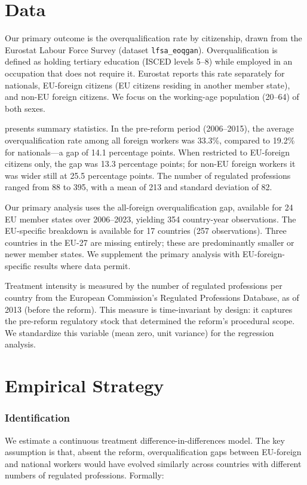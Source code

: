 \documentclass[12pt]{article}
\begin{document}
\section{Data}\label{sec:data}

Our primary outcome is the overqualification rate by citizenship, drawn from the Eurostat Labour Force Survey (dataset \texttt{lfsa\_eoqgan}). Overqualification is defined as holding tertiary education (ISCED levels 5--8) while employed in an occupation that does not require it. Eurostat reports this rate separately for nationals, EU-foreign citizens (EU citizens residing in another member state), and non-EU foreign citizens. We focus on the working-age population (20--64) of both sexes.



 presents summary statistics. In the pre-reform period (2006--2015), the average overqualification rate among all foreign workers was 33.3\%, compared to 19.2\% for nationals---a gap of 14.1 percentage points. When restricted to EU-foreign citizens only, the gap was 13.3 percentage points; for non-EU foreign workers it was wider still at 25.5 percentage points. The number of regulated professions ranged from 88 to 395, with a mean of 213 and standard deviation of 82.

Our primary analysis uses the all-foreign overqualification gap, available for 24 EU member states over 2006--2023, yielding 354 country-year observations. The EU-specific breakdown is available for 17 countries (257 observations). Three countries in the EU-27 are missing entirely; these are predominantly smaller or newer member states. We supplement the primary analysis with EU-foreign-specific results where data permit.

Treatment intensity is measured by the number of regulated professions per country from the European Commission's Regulated Professions Database, as of 2013 (before the reform). This measure is time-invariant by design: it captures the pre-reform regulatory stock that determined the reform's procedural scope. We standardize this variable (mean zero, unit variance) for the regression analysis.


\section{Empirical Strategy}\label{sec:empirical}

\subsubsection*{Identification} We estimate a continuous treatment difference-in-differences model. The key assumption is that, absent the reform, overqualification gaps between EU-foreign and national workers would have evolved similarly across countries with different numbers of regulated professions. Formally:
\end{document}
